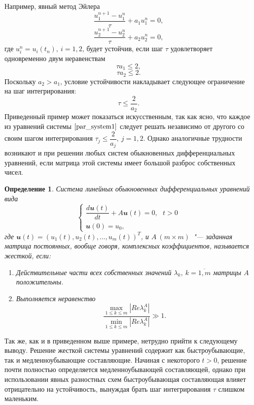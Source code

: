 \documentclass[11pt,a4paper,twoside,listtotoc,bibtotoc]{report}
\numberwithin{equation}{section}
\newtheorem*{definition}{Определение}
\theoremstyle{definition}
\theoremstyle{plain}
\newcommand{\vfunc}[1]{\mathbfit{#1}}
\begin{document}
Например, явный метод Эйлера
%
$$
    \dfrac{u_1^{n+1} - u_1^n}{\tau} + a_1u_1^n = 0,
$$
%
$$
    \dfrac{u_2^{n+1} - u_2^n}{\tau} + a_2u_2^n = 0,
$$
%
где $u_i^n = u_i(t_n),~i=1,2$, будет устойчив, если шаг $\tau$
удовлетворяет одновременно двум неравенствам
%
$$
    \tau a_1 \leqslant 2,
$$
%
$$
    \tau a_2 \leqslant 2.
$$
%
Поскольку $a_2 > a_1$, условие устойчивости накладывает следующее
ограничение на шаг интегрирования:
%
$$
    \tau \leqslant \dfrac{2}{a_2}.
$$
%
Приведенный пример может показаться искусственным, так как ясно,
что каждое из уравнений системы $\eqref{par_system1}$ следует
решать независимо от другого со своим шагом интегрирования
$\tau_j \leqslant \dfrac{2}{a_j},~j=1,2$. Однако аналогичные трудности
возникают и при решении любых систем обыкновенных дифференциальных уравнений,
если матрица этой системы имеет большой разброс собственных чисел.
%
\begin{definition}
%
    Система линейных обыкновенных дифференциальных уравнений вида
    $$
        \begin{cases}
            \dfrac{d\vfunc{u}(t)}{dt} + A\vfunc{u}(t) = 0,~~~ t>0 \\
            \vfunc{u}(0)=u_0,
        \end{cases}
    $$
    где $\vfunc{u}(t) = (u_1(t), u_2(t), \ldots, u_m(t))^T$, и $A~(m \times m)$~"--- заданная
    матрица постоянных, вообще говоря, комплексных коэффициентов, называется жесткой,
    если:
    \begin{enumerate}
        \item
        Действительные части всех собственных значений
        $\lambda_k,~k=\overline{1,m}$ матрицы $A$ положительны.
        \item
        Выполняется неравенство
        $$
            \dfrac{\underset{1 \leqslant k \leqslant m}
            \max\left|Re\lambda^A_k\right|}{\underset{1 \leqslant k
            \leqslant m}\min\left|Re\lambda^A_k\right|} \gg 1.
        $$
    \end{enumerate}
%
\end{definition}
%
Так же, как и в приведенном выше примере, нетрудно прийти к следующему выводу.
Решение жесткой системы уравнений содержит как быстроубывающие, так и
медленноубывающие составляющие. Начиная с некоторого $t > 0$, решение
почти полностью определяется медленноубывающей составляющей, однако при
использовании явных разностных схем быстроубывающая составляющая влияет
отрицательно на устойчивость, вынуждая брать шаг интегрирования $\tau$
слишком маленьким.
\end{document}

